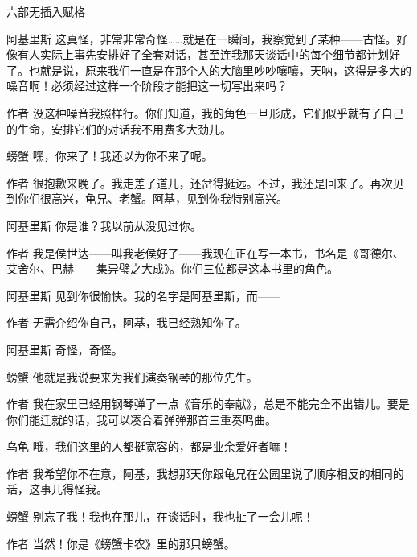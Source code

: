 \begin{dialog}{六部无插入赋格}
\begin{dialogue}
\item[阿基里斯]这真怪，非常非常奇怪……就是在一瞬间，我察觉到了某种——古怪。好像有人实际上事先安排好了全套对话，甚至连我那天谈话中的每个细节都计划好了。也就是说，原来我们一直是在那个人的大脑里吵吵嚷嚷，天呐，这得是多大的噪音啊！必须经过这样一个阶段才能把这一切写出来吗？


\item[作者]没这种噪音我照样行。你们知道，我的角色一旦形成，它们似乎就有了自己的生命，安排它们的对话我不用费多大劲儿。

\item[螃蟹]嘿，你来了！我还以为你不来了呢。

\item[作者]很抱歉来晚了。我走差了道儿，还岔得挺远。不过，我还是回来了。再次见到你们很高兴，龟兄、老蟹。阿基，见到你我特别高兴。

\item[阿基里斯]你是谁？我以前从没见过你。

\item[作者]我是侯世达——叫我老侯好了——我现在正在写一本书，书名是《哥德尔、艾舍尔、巴赫——集异璧之大成》。你们三位都是这本书里的角色。

\item[阿基里斯]见到你很愉快。我的名字是阿基里斯，而——

\item[作者]无需介绍你自己，阿基，我已经熟知你了。

\item[阿基里斯]奇怪，奇怪。

\item[螃蟹]他就是我说要来为我们演奏钢琴的那位先生。

\item[作者]我在家里已经用钢琴弹了一点《音乐的奉献》，总是不能完全不出错儿。要是你们能迁就的话，我可以凑合着弹弹那首三重奏鸣曲。

\item[乌龟]哦，我们这里的人都挺宽容的，都是业余爱好者嘛！

\item[作者]我希望你不在意，阿基，我想那天你跟龟兄在公园里说了顺序相反的相同的话，这事儿得怪我。

\item[螃蟹]别忘了我！我也在那儿，在谈话时，我也扯了一会儿呢！

\item[作者]当然！你是《螃蟹卡农》里的那只螃蟹。


\end{dialogue}
\end{dialog}
